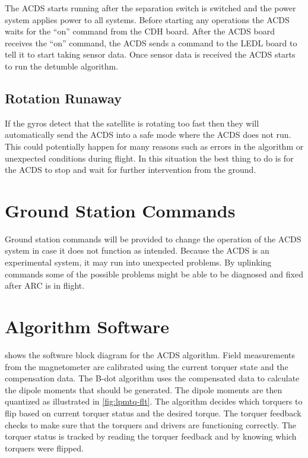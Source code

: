 The \ac{ACDS} starts running after the separation switch is switched and the power system applies power to all systems. Before starting any operations the \ac{ACDS} waits for the \enquote{on} command from the \ac{CDH} board. After the \ac{ACDS} board receives the \enquote{on} command, the \ac{ACDS} sends a command to the \ac{LEDL} board to tell it to start taking sensor data. Once sensor data is received the \ac{ACDS} starts to run the detumble algorithm.

\subsection{Rotation Runaway}

If the gyros detect that the satellite is rotating too fast then they will automatically send the \ac{ACDS} into a safe mode where the \ac{ACDS} does not run. This could potentially happen for many reasons such as errors in the algorithm or unexpected conditions during flight. In this situation the best thing to do is for the \ac{ACDS} to stop and wait for further intervention from the ground.

\section{Ground Station Commands}

Ground station commands will be provided to change the operation of the \ac{ACDS} system in case it does not function as intended. Because the \ac{ACDS} is an experimental system, it may run into unexpected problems. By uplinking commands some of the possible problems might be able to be diagnosed and fixed after \ac{ARC} is in flight. 

\section{Algorithm Software}

 shows the software block diagram for the \ac{ACDS} algorithm. Field measurements from the magnetometer are calibrated using the current torquer state and the compensation data. The B-dot algorithm uses the compensated data to calculate the dipole moments that should be generated. The dipole moments are then quantized as illustrated in \cref{fig:lpmtq-flt}. The algorithm decides which torquers to flip based on current torquer status and the desired torque. The torquer feedback checks to make sure that the torquers and drivers are functioning correctly. The torquer status is tracked by reading the torquer feedback and by knowing which torquers were flipped.

